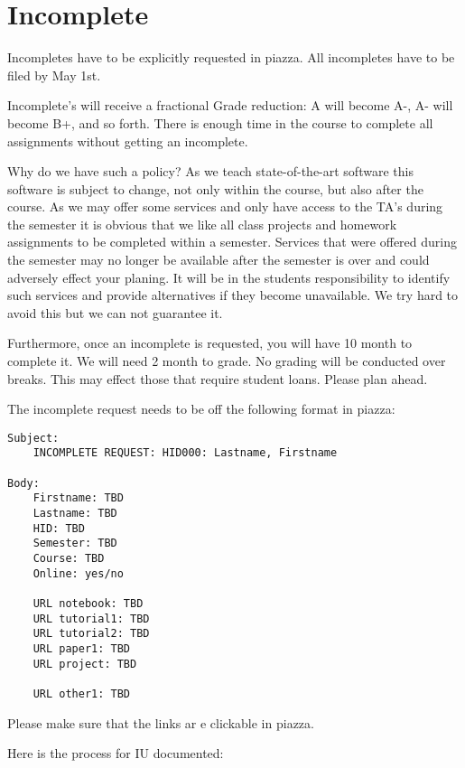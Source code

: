 \section{Incomplete}\label{incomplete}

Incompletes have to be explicitly requested in piazza. All incompletes
have to be filed by May 1st.

Incomplete's will receive a fractional Grade reduction: A will
become A-, A- will become B+, and so forth. There is enough time in the
course to complete all assignments without getting an incomplete.

Why do we have such a policy? As we teach state-of-the-art software this
software is subject to change, not only within the course, but also
after the course. As we may offer some services and only have access to
the TA's during the semester it is obvious that we like all class
projects and homework assignments to be completed within a semester.
Services that were offered during the semester may no longer be
available after the semester is over and could adversely effect your
planing. It will be in the students responsibility to identify such
services and provide alternatives if they become unavailable. We try
hard to avoid this but we can not guarantee it.

Furthermore, once an incomplete is requested, you will have 10 month to
complete it. We will need 2 month to grade. No grading will be conducted
over breaks. This may effect those that require student loans. Please
plan ahead.

The incomplete request needs to be off the following format in piazza:

\begin{verbatim}
Subject: 
    INCOMPLETE REQUEST: HID000: Lastname, Firstname

Body:
    Firstname: TBD
    Lastname: TBD
    HID: TBD
    Semester: TBD
    Course: TBD
    Online: yes/no

    URL notebook: TBD    
    URL tutorial1: TBD
    URL tutorial2: TBD
    URL paper1: TBD
    URL project: TBD

    URL other1: TBD
\end{verbatim}

Please make sure that the links ar e clickable in piazza. 

\begin{IU}
Here is the process for IU documented:

\end{IU}


